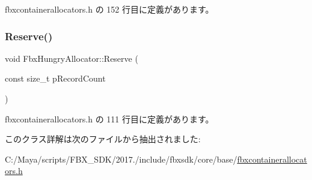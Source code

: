  fbxcontainerallocators.\+h の 152 行目に定義があります。

\mbox{\label{class_fbx_hungry_allocator_a8aeb6180f5d6ce87b57d0505520144b5}} 
\subsubsection{\texorpdfstring{Reserve()}{Reserve()}}
{\footnotesize\ttfamily void Fbx\+Hungry\+Allocator\+::\+Reserve (\begin{DoxyParamCaption}\item[{const size\+\_\+t}]{p\+Record\+Count }\end{DoxyParamCaption})\hspace{0.3cm}{\ttfamily [inline]}}



 fbxcontainerallocators.\+h の 111 行目に定義があります。



このクラス詳解は次のファイルから抽出されました\+:\begin{DoxyCompactItemize}
\item 
C\+:/\+Maya/scripts/\+F\+B\+X\+\_\+\+S\+D\+K/2017./include/fbxsdk/core/base/\hyperlink{fbxcontainerallocators_8h}{fbxcontainerallocators.\+h}\end{DoxyCompactItemize}

